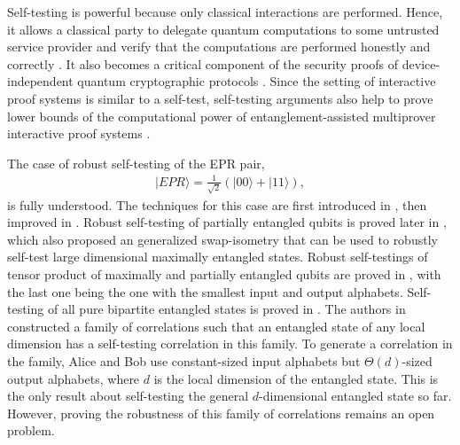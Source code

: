 \documentclass[11pt,letterpaper]{article}
\newcommand{\ket}[1]{|#1\rangle}
\newcommand{\1}{\mathbb{1}}
\theoremstyle{definition}
\begin{document}
Self-testing is powerful because only classical interactions are performed.
Hence, it allows a classical party to delegate quantum computations to some untrusted service provider
and verify that the computations are performed
honestly and correctly \cite{ruv2013,coladan2017verifier}.
It also becomes a critical component of the security proofs of device-independent quantum cryptographic protocols
\cite{mayersyao,vv2014,miller2017,fu2018,eat2018}.
Since the setting of interactive proof systems is similar to a self-test, self-testing arguments also help to prove
lower bounds of the computational power of entanglement-assisted
multiprover interactive proof systems \cite{fitzsimons2019, neexp}.

The case of robust self-testing of the EPR pair, 
\begin{align*}
    \ket{EPR} = \frac{1}{\sqrt{2}}(\ket{00}+\ket{11}),
\end{align*}
is fully understood.
The techniques for this case are 
first introduced in \cite{mckague2012}, then improved in \cite{bamps2015}. 
Robust self-testing of partially entangled qubits is proved later in
\cite{yang2013}, which also proposed an generalized swap-isometry
that can be used to robustly self-test large dimensional maximally entangled states.
Robust self-testings of tensor product of maximally and partially entangled qubits 
are proved in \cite{coladan2016parallel,natarajan2017,lowdegree},
with the last one being the one with the smallest input and output alphabets.
Self-testing of all pure bipartite entangled states is proved in \cite{coladan2017all}.
The authors in \cite{coladan2017all} constructed a family of correlations such
that an entangled state of any local dimension has
a self-testing correlation in this family.
To generate a correlation in the family, Alice and Bob
use constant-sized input alphabets but $\Theta(d)$-sized output alphabets, 
where $d$ is the local dimension of the entangled state. 
This is the only result about self-testing the general $d$-dimensional entangled state so far.
However, proving the robustness of this family of correlations remains an open problem. 
\end{document}
